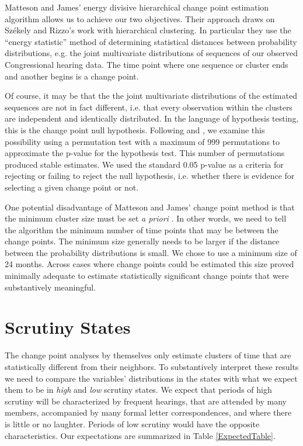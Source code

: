 \documentclass[a4paper]{article}\usepackage[]{graphicx}\usepackage[]{color}
\begin{document}
Matteson and James' \citeyearpar{Matteson2014} energy divisive hierarchical change point estimation algorithm allows us to achieve our two objectives. Their approach draws on Sz{\'e}kely and Rizzo's \citeyearpar{Szekely2005} work with hierarchical clustering. In particular they use the ``energy statistic'' method of determining statistical distances between probability distributions, e.g. the joint multivariate distributions of sequences of our observed Congressional hearing data. The time point where one sequence or cluster ends and another begins is a change point.

Of course, it may be that the the joint multivariate distributions of the estimated sequences are not in fact different, i.e. that every observation within the clusters are independent and identically distributed. In the language of hypothesis testing, this is the change point null hypothesis. Following \cite{Matteson2014} and \cite{Rizzo2010}, we examine this possibility using a permutation test with a maximum of 999 permutations to approximate the p-value for the hypothesis test. This number of permutations produced stable estimates. We used the standard 0.05 p-value as a criteria for rejecting or failing to reject the null hypothesis, i.e. whether there is evidence for selecting a given change point or not.

One potential disadvantage of Matteson and James' change point method is that the minimum cluster size must be set \emph{a priori} \citeyearpar[337]{Matteson2014}. In other words, we need to tell the algorithm the minimum number of time points that may be between the change points. The minimum size generally needs to be larger if the distance between the probability distributions is small. We chose to use a minimum size of 24 months. Across cases where change points could be estimated this size proved minimally adequate to estimate statistically significant change points that were substantively meaningful.

\section{Scrutiny States}

The change point analyses by themselves only estimate clusters of time that are statistically different from their neighbors. To substantively interpret these results we need to compare the variables' distributions in the states with what we expect them to be in \emph{high} and \emph{low} scrutiny states. We expect that periods of high scrutiny will be characterized by frequent hearings, that are attended by many members, accompanied by many formal letter correspondences, and where there is little or no laughter. Periods of low scrutiny would have the opposite characteristics. Our expectations are summarized in Table \ref{ExpectedTable}.
\end{document}

